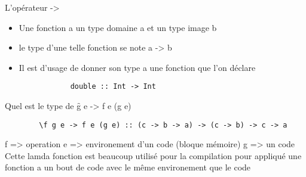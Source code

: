 \documentclass{article}
\begin{document}
    L'opérateur ->
    \begin{itemize}
        \item Une fonction a un type domaine a et un type image b
        \item le type d'une telle fonction se note a -> b
        \item Il est d'usage de donner son type a une fonction que l'on déclare
        \begin{lstlisting}
            double :: Int -> Int
        \end{lstlisting}
    \end{itemize}

    Quel est le type de \f g e -> f e (g e)
    \begin{lstlisting}
        \f g e -> f e (g e) :: (c -> b -> a) -> (c -> b) -> c -> a
    \end{lstlisting}
    f => operation
    e => environement d'un code (bloque mémoire)
    g => un code 
    Cette lamda fonction est beaucoup utilisé pour la compilation pour appliqué une fonction a un bout de code avec le même environement que le code
\end{document}
